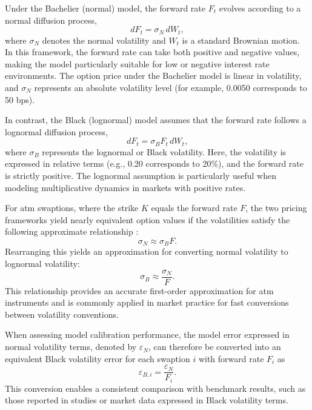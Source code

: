 Under the Bachelier (normal) model, the forward rate \( F_t \) evolves according to a normal diffusion process,
\begin{equation}
	dF_t = \sigma_N \, dW_t,
\end{equation}
where \( \sigma_N \) denotes the normal volatility and \( W_t \) is a standard Brownian motion. In this framework, the forward rate can take both positive and negative values, making the model particularly suitable for low or negative interest rate environments. The option price under the Bachelier model is linear in volatility, and \( \sigma_N \) represents an absolute volatility level (for example, 0.0050 corresponds to 50 \ac{bps}).

In contrast, the Black (lognormal) model assumes that the forward rate follows a lognormal diffusion process,
\begin{equation}
	dF_t = \sigma_B F_t \, dW_t,
\end{equation}
where \( \sigma_B \) represents the lognormal or Black volatility. Here, the volatility is expressed in relative terms (e.g., 0.20 corresponds to 20\%), and the forward rate is strictly positive. The lognormal assumption is particularly useful when modeling multiplicative dynamics in markets with positive rates.

For \ac{atm} swaptions, where the strike \( K \) equals the forward rate \( F \), the two pricing frameworks yield nearly equivalent option values if the volatilities satisfy the following approximate relationship \parencite{hagan2002managingsmilerisk}:
\begin{equation}
	\sigma_N \approx \sigma_B F.
\end{equation}
Rearranging this yields an approximation for converting normal volatility to lognormal volatility:
\begin{equation}
	\sigma_B \approx \frac{\sigma_N}{F}.
\end{equation}
This relationship provides an accurate first-order approximation for \ac{atm} instruments and is commonly applied in market practice for fast conversions between volatility conventions.

When assessing model calibration performance, the model error expressed in normal volatility terms, denoted by \( \varepsilon_N \), can therefore be converted into an equivalent Black volatility error for each swaption \( i \) with forward rate \( F_i \) as
\begin{equation}
	\varepsilon_{B,i} = \frac{\varepsilon_N}{F_i}.
\end{equation}
This conversion enables a consistent comparison with benchmark results, such as those reported in studies or market data expressed in Black volatility terms.

